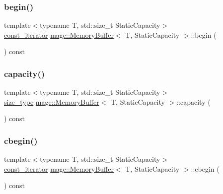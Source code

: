 \subsubsection{\texorpdfstring{begin()}{begin()}\hspace{0.1cm}{\footnotesize\ttfamily [2/2]}}
{\footnotesize\ttfamily template$<$typename T, std\+::size\+\_\+t Static\+Capacity$>$ \\
\mbox{\hyperlink{classmage_1_1_memory_buffer_a3cc14c15660c36d35195e1836db33ee7}{const\+\_\+iterator}} \mbox{\hyperlink{classmage_1_1_memory_buffer}{mage\+::\+Memory\+Buffer}}$<$ T, Static\+Capacity $>$\+::begin (\begin{DoxyParamCaption}{ }\end{DoxyParamCaption}) const\hspace{0.3cm}{\ttfamily [noexcept]}}

\mbox{\label{classmage_1_1_memory_buffer_aaec3776527d464a2b47f301c08fb0206}} 
\subsubsection{\texorpdfstring{capacity()}{capacity()}}
{\footnotesize\ttfamily template$<$typename T, std\+::size\+\_\+t Static\+Capacity$>$ \\
\mbox{\hyperlink{classmage_1_1_memory_buffer_a77b459da2e6f1c57c21467a6eff8e9f9}{size\+\_\+type}} \mbox{\hyperlink{classmage_1_1_memory_buffer}{mage\+::\+Memory\+Buffer}}$<$ T, Static\+Capacity $>$\+::capacity (\begin{DoxyParamCaption}{ }\end{DoxyParamCaption}) const\hspace{0.3cm}{\ttfamily [noexcept]}}

\mbox{\label{classmage_1_1_memory_buffer_a87ffbff84c954542613a561308502527}} 
\subsubsection{\texorpdfstring{cbegin()}{cbegin()}}
{\footnotesize\ttfamily template$<$typename T, std\+::size\+\_\+t Static\+Capacity$>$ \\
\mbox{\hyperlink{classmage_1_1_memory_buffer_a3cc14c15660c36d35195e1836db33ee7}{const\+\_\+iterator}} \mbox{\hyperlink{classmage_1_1_memory_buffer}{mage\+::\+Memory\+Buffer}}$<$ T, Static\+Capacity $>$\+::cbegin (\begin{DoxyParamCaption}{ }\end{DoxyParamCaption}) const\hspace{0.3cm}{\ttfamily [noexcept]}}

